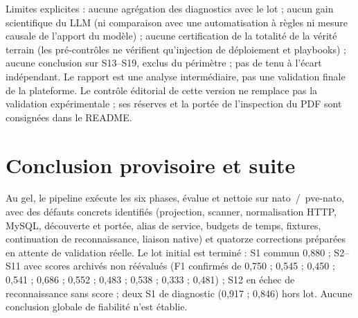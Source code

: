 \documentclass[11pt,a4paper]{article}
\begin{document}
Limites explicites : aucune agr\'egation des diagnostics avec le lot ; aucun gain scientifique du LLM (ni comparaison avec une automatisation \`a r\`egles ni mesure causale de l'apport du mod\`ele) ; aucune certification de la totalit\'e de la v\'erit\'e terrain (les pr\'e-contr\^oles ne v\'erifient qu'injection de d\'eploiement et playbooks) ; aucune conclusion sur S13--S19, exclus du p\'erim\`etre ; pas de tenu \`a l'\'ecart ind\'ependant. Le rapport est une analyse interm\'ediaire, pas une validation finale de la plateforme. Le contrôle éditorial de cette version ne remplace pas la validation expérimentale ; ses réserves et la portée de l'inspection du PDF sont consignées dans le README.

\section{Conclusion provisoire et suite}
\label{sec:conclusion}
Au gel, le pipeline ex\'ecute les six phases, \'evalue et nettoie sur nato~/~pve-nato, avec des d\'efauts concrets identifi\'es (projection, scanner, normalisation HTTP, MySQL, d\'ecouverte et port\'ee, alias de service, budgets de temps, fixtures, continuation de reconnaissance, liaison native) et quatorze corrections pr\'epar\'ees en attente de validation r\'eelle. Le lot initial est termin\'e : S1 commun 0,880 ; S2--S11 avec scores archiv\'es non r\'e\'evalu\'es (F1 confirm\'es de 0,750 ; 0,545 ; 0,450 ; 0,541 ; 0,686 ; 0,552 ; 0,483 ; 0,538 ; 0,333 ; 0,481) ; S12 en \'echec de reconnaissance sans score ; deux S1 de diagnostic (0,917 ; 0,846) hors lot. Aucune conclusion globale de fiabilit\'e n'est \'etablie.
\end{document}
